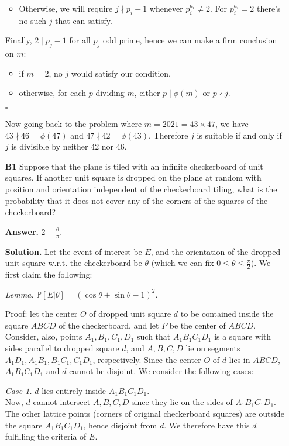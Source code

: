 \documentclass[11pt,a4paper]{article}
\newcommand{\bbP}{\mathbb P}
\newcommand{\<}{\langle}
\renewcommand{\>}{\rangle}
\begin{document}
\begin{enumerate}
\begin{itemize}
		\item Otherwise, we will require $j\nmid p_i-1$ whenever $p_i^{a_i}\neq 2$. 
		For $p_i^{a_i}=2$ there's no such $j$ that can satisfy. 
	\end{itemize}
    Finally, $2\mid p_j-1$ for all $p_j$ odd prime, hence we can make a firm conclusion on $m$: 
    \begin{itemize}
    	\item if $m=2$, no $j$ would satisfy our condition. 
    	
    	\item otherwise, for each $p$ dividing $m$, either $p\mid \phi(m)$ or $p\nmid j$. 
    \end{itemize}
	$\square$ 
	
	Now going back to the problem where $m=2021=43\times 47$, we have $43\nmid 46=\phi(47)$ and 
	$47\nmid 42=\phi(43)$. 
	Therefore $j$ is suitable if and only if $j$ is divisible by neither 42 nor 46. 
	
	\item [\textbf{B1}] 
	Suppose that the plane is tiled with an infinite checkerboard of unit squares. If another unit square is dropped on the plane at random with position and orientation independent of the checkerboard tiling, what is the probability that it does not cover any of the corners of the squares of the checkerboard?
	
	\textbf{Answer.} $2-\frac{6}{\pi}$. 
	
	\textbf{Solution.} Let the event of interest be $E$, 
	and the orientation of the dropped unit square w.r.t. the checkerboard be $\theta$ (which we can fix $0\le \theta\le \frac{\pi}{2}$). We first claim the following: 
	
	\emph{Lemma.} $\bbP[E|\theta]=(\cos\theta + \sin\theta - 1)^2$. 
	
	Proof: let the center $O$ of dropped unit square $d$ to be contained inside the square $ABCD$ of the checkerboard, and let $P$ be the center of $ABCD$. 
	Consider, also, points $A_1, B_1, C_1, D_1$ such that $A_1B_1C_1D_1$ is a square with sides parallel to dropped square $d$, and $A, B, C, D$ lie on segments $A_1D_1, A_1B_1, B_1C_1, C_1D_1$, respectively. 
	Since the center $O$ of $d$ lies in $ABCD$, $A_1B_1C_1D_1$ and $d$ cannot be disjoint. We consider the following cases: 
	
	\emph{Case 1.} $d$ lies entirely inside $A_1B_1C_1D_1$. \\
	Now, $d$ cannot intersect $A, B, C, D$ since they lie on the sides of $A_1B_1C_1D_1$. 
	The other lattice points (corners of original checkerboard squares) are outside the square $A_1B_1C_1D_1$, 
	hence disjoint from $d$. We therefore have this $d$ fulfilling the criteria of $E$. 
	

\end{enumerate}
\end{document}
